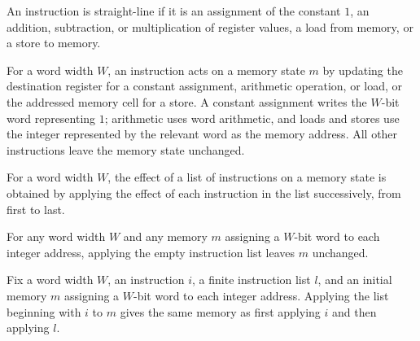 \begin{definition}
\label{WordRAM.Straight}
\leanok
{}
An instruction is straight-line if it is an assignment of the constant $1$, an addition,
subtraction, or multiplication of register values, a load from memory, or a store to
memory.
\end{definition}

\begin{definition}
\label{WordRAM.effect}
\leanok
{}
For a word width $W$, an instruction acts on a memory state $m$ by updating the
destination register for a constant assignment, arithmetic operation, or load, or the
addressed memory cell for a store. A constant assignment writes the $W$-bit word
representing $1$; arithmetic uses word arithmetic, and loads and stores use the integer
represented by the relevant word as the memory address. All other instructions leave the
memory state unchanged.
\end{definition}

\begin{definition}
\label{WordRAM.effects}
\leanok
{}
For a word width $W$, the effect of a list of instructions on a memory state is obtained
by applying the effect of each instruction in the list successively, from first to last.
\end{definition}

\begin{theorem}
\label{WordRAM.effects_nil}
\leanok
{}
For any word width $W$ and any memory $m$ assigning a $W$-bit word to each integer
address, applying the empty instruction list leaves $m$ unchanged.
\end{theorem}

\begin{theorem}
\label{WordRAM.effects_cons}
\leanok
{}
Fix a word width $W$, an instruction $i$, a finite instruction list $l$, and an initial
memory $m$ assigning a $W$-bit word to each integer address. Applying the list beginning
with $i$ to $m$ gives the same memory as first applying $i$ and then applying $l$.
\end{theorem}

